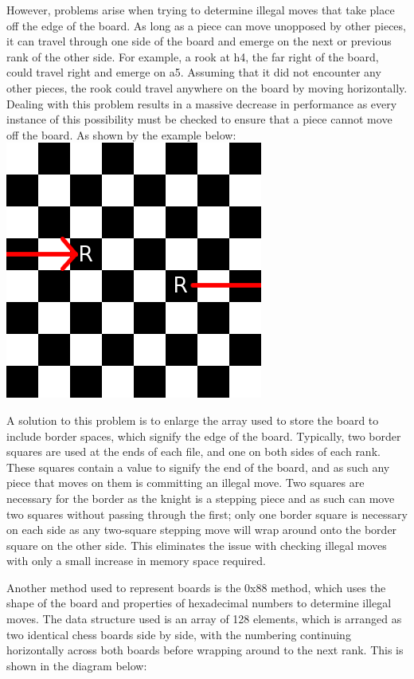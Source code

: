 \documentclass{l3proj}
\begin{document}
	However, problems arise when trying to determine illegal moves that take place off the edge of the board. As long as a piece can move unopposed by other pieces, it can travel through one side of the board and emerge on the next or previous rank of the other side. For example, a rook at h4, the far right of the board, could travel right and emerge on a5. Assuming  that it did not encounter any other pieces, the rook could travel anywhere on the board by moving horizontally. Dealing with this problem results in a massive decrease in performance as every instance of this possibility must be checked to ensure that a piece cannot move off the board. As shown by the example below: \\

\includegraphics[scale = 0.75]{images/illegalmove.png}

	A solution to this problem is to enlarge the array used to store the board to include border spaces, which signify the edge of the board. Typically, two border squares are used at the ends of each file, and one on both sides of each rank. These squares contain a value to signify the end of the board, and as such any piece that moves on them is committing an illegal move. Two squares are necessary for the border as the knight is a stepping piece and as such can move two squares without passing through the first; only one border square is necessary on each side as any two-square stepping move will wrap around onto the border square on the other side. This eliminates the issue with checking illegal moves with only a small increase in memory space required.

	Another method used to represent boards is the 0x88 method, which uses the shape of the board and properties of hexadecimal numbers to determine illegal moves. The data structure used is an array of 128 elements, which is arranged as two identical chess boards side by side, with the numbering continuing horizontally across both boards before wrapping around to the next rank. This is shown in the diagram below:\\
\end{document}
